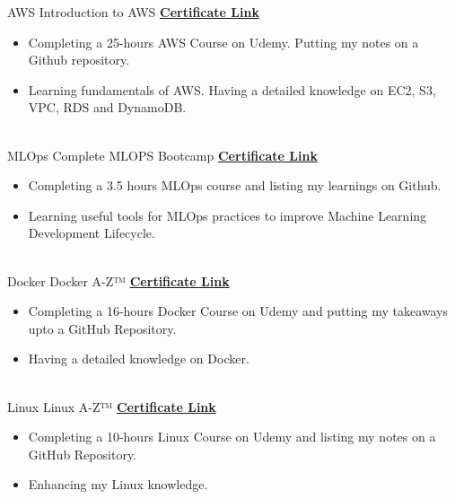 \documentclass[letterpaper]{DS_class_file} %
\begin{document}
\begin{twenty} %
    \twentyitem
	{AWS}
	{}
	{\hspace{0.3cm}Introduction to AWS}
	{\href{https://www.udemy.com/certificate/UC-8773cc22-c86d-43a9-89ad-4c4e8e02aa38/}{\textbf{Certificate Link}}}
	{}
	{
		{\begin{itemize}
				\item Completing a 25-hours AWS Course on Udemy. Putting my notes on a Github repository.
				\item Learning fundamentals of AWS. Having a detailed knowledge on EC2, S3, VPC, RDS and DynamoDB.
		\end{itemize}}
	}
	\\
	\twentyitem
	{MLOps}
	{}
	{\hspace{0.3cm}Complete MLOPS Bootcamp}
	{\href{https://www.udemy.com/certificate/UC-2296034a-bb96-4d35-80b5-dd956cceeeb7/}{\textbf{Certificate Link}}}
	{}
	{
		{\begin{itemize}
				\item Completing a 3.5 hours MLOps course and listing my learnings on Github.
				\item Learning useful tools for MLOps practices to improve Machine Learning Development Lifecycle.
		\end{itemize}}
	}
	\\
	\twentyitem
	{Docker}
	{}
	{\hspace{0.3cm}Docker A-Z™}
	{\href{https://www.udemy.com/certificate/UC-c1ab98de-9803-452b-9166-8ef3ae797e5a/}{\textbf{Certificate Link}}}
	{}
	{
		{\begin{itemize}
				\item Completing a 16-hours Docker Course on Udemy and putting my takeaways upto a GitHub Repository.
				\item Having a detailed knowledge on Docker.
		\end{itemize}}
	}
	\\
	\twentyitem
	{Linux}
	{}
	{\hspace{0.3cm}Linux A-Z™}
	{\href{https://www.udemy.com/certificate/UC-74719d94-89af-44ba-ab2d-4299dd2ec3dd/}{\textbf{Certificate Link}}}
	{}
	{
		{\begin{itemize}
				\item Completing a 10-hours Linux Course on Udemy and listing my notes on a GitHub Repository.
				\item Enhancing my Linux knowledge.
		\end{itemize}}
	}
	\\

\end{twenty}
\end{document}
